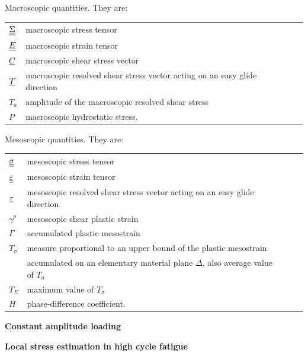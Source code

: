 \begin{flushleft}
	Macroscopic quantities. They are:
	\begin{table}[!h]
		\begin{tabular}{lllll}
			$\uline{\uline{\Sigma}}$ & macroscopic stress tensor &  &  &  \\
			$\uline{\uline{E}}$ & macroscopic strain tensor &  &  &  \\
			${\uline{C}}$ & macroscopic shear stress vector  &  &  &  \\
			${\uline{T}}$ & macroscopic resolved shear stress vector acting on an easy glide direction&  &  &  \\
			$T_a$ & amplitude of the macroscopic resolved shear stress  &  &  &  \\	
			$P$ & macroscopic hydrostatic stress.&  &  &  \\	
		\end{tabular}
	\end{table}
	
	Mesoscopic quantities. They are:
	\begin{table}[!h]
		\begin{tabular}{lllll}
			$\uline{\uline{\sigma}}$& mesoscopic stress tensor &  &  &  \\
			$\uline{\uline{\varepsilon}}$ & mesoscopic strain tensor &  &  &  \\
			$\uline{\tau}$& mesoscopic resolved shear stress vector acting on an easy glide direction &  &  &  \\
			$\gamma^p$& mesoscopic shear plastic strain &  &  &  \\
			$\Gamma$ & accumulated plastic mesostrain &  &  &  \\
			$T_\sigma$ & measure proportional to an upper bound of the plastic mesostrain  &  &  &  \\
			& accumulated on an elementary
			material plane $\Delta$, also average value of $T_a$&  &  &  \\
			$T_\Sigma$ & maximum value of  $T_\sigma$&  &  &  \\
			$H$ & phase-difference coefficient.&  &  &  \\
		\end{tabular}
	\end{table}
\end{flushleft}

\newpage
\textbf{Constant amplitude loading}
\vspace{6pt}

\textbf{Local stress estimation in high cycle fatigue}

